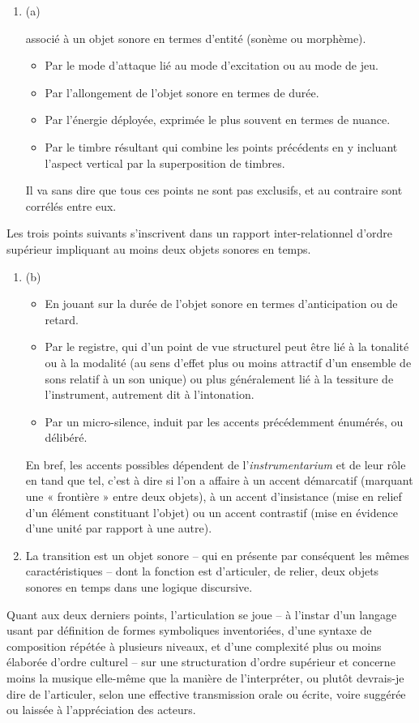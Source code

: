 \documentclass{article}
\newcommand{\myuline}[1]{%
  \uline{\phantom{#1}}%
  \llap{{#1}}%
}
\begin{document}
\begin{enumerate}
\item (a) \myuline{Accent} 

associé à un objet sonore en termes d’entité (sonème ou morphème).

\begin{itemize}
\item Par le mode d’attaque lié au mode d’excitation ou au mode de jeu.
\item Par l'allongement de l'objet sonore en termes de durée.
\item Par l’énergie déployée, exprimée le plus souvent en termes de nuance. 
\item Par le timbre résultant qui combine les points précédents en y incluant l'aspect vertical par la superposition de timbres.
\end{itemize}
Il va sans dire que tous ces points ne sont pas exclusifs, et au contraire sont corrélés entre eux.
 \end{enumerate}
Les trois points suivants s’inscrivent dans un rapport inter-relationnel d’ordre supérieur impliquant au moins deux objets sonores en temps.
\begin{enumerate}
\item (b) \myuline{Accent}
\begin{itemize}
\item En jouant sur la durée de l'objet sonore en termes d'anticipation ou de retard.
\item Par le registre, qui d’un point de vue structurel peut être lié à la tonalité ou à la modalité (au sens d’effet plus ou moins attractif d’un ensemble de sons relatif à un son unique) ou plus généralement lié à la tessiture de l'instrument, autrement dit à l’intonation.
\item Par un micro-silence, induit par les accents précédemment énumérés, ou délibéré.
\end{itemize}

En bref, les accents possibles dépendent de l'\textit{instrumentarium} et de leur rôle en tand que tel, c’est à dire si l’on a affaire à un accent démarcatif (marquant une « frontière » entre deux objets), à un accent d’insistance (mise en relief d'un élément constituant l'objet) ou un accent contrastif (mise en évidence d'une unité par rapport à une autre).

\item \myuline{Transition}

La transition est un objet sonore -- qui en présente par conséquent les mêmes caractéristiques --  dont la fonction est d'articuler, de relier, deux objets sonores en temps dans une logique discursive.

 \end{enumerate}
Quant aux deux derniers points, l'articulation se joue -- à l'instar d'un langage usant par définition de formes symboliques inventoriées, d'une syntaxe de composition répétée à plusieurs niveaux, et d'une complexité plus ou moins élaborée d'ordre culturel -- sur une structuration d'ordre supérieur et concerne moins la musique elle-même que la manière de l'interpréter, ou plutôt devrais-je dire de l'articuler, selon une effective transmission orale ou écrite, voire suggérée ou laissée à l'appréciation des acteurs. 
\end{document}
